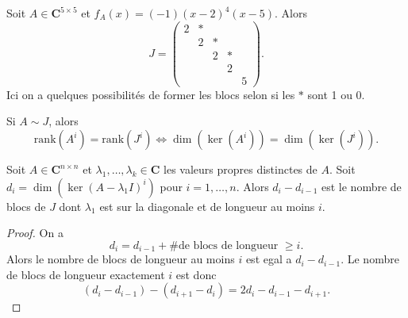 \begin{example}
Soit $A\in \mathbf{C}^{5\times5}$ et $f_{A}(x)=(-1)(x-2)^{4}(x-5)$. Alors
$$
J=\begin{pmatrix}
2 & * \\
 & 2  & *\\
 &  & 2  & *\\
 &  &  & 2 \\
 &  &  &  & 5
\end{pmatrix}.
$$
Ici on a quelques possibilités de former les blocs selon si les $*$ sont 1 ou 0. 
\end{example}
\begin{reminder}
Si $A\sim J$, alors
$$
\mathrm{rank}(A^{i})=\mathrm{rank}(J^{i})\Leftrightarrow \dim(\ker(A^{i}))=\dim(\ker(J^{i})).
$$
\end{reminder}
\begin{theorem}
Soit $A\in \mathbf{C}^{n\times n}$ et $\lambda_{1},\dots,\lambda _{k}\in \mathbf{C}$ les valeurs propres distinctes de $A$. Soit $d_{i}=\dim(\ker(A-\lambda_{1}I)^{i})$ pour $i=1,\dots,n$. Alors $d_{i}-d_{i-1}$ est le nombre de blocs de $J$ dont $\lambda _{1}$ est sur la diagonale et de longueur au moins $i$.
\end{theorem}
\begin{proof}
On a
$$
d_{i}=d_{i-1}+\text{\# de blocs de longueur }\ge i.
$$
Alors le nombre de blocs de longueur au moins $i$ est egal a $d_{i}-d_{i-1}$. Le nombre de blocs de longueur exactement $i$ est donc 
$$
(d_{i}-d_{i-1})-(d_{i+1}-d_{i})=2d_{i}-d_{i-1}-d_{i+1}.
$$
\end{proof}

	